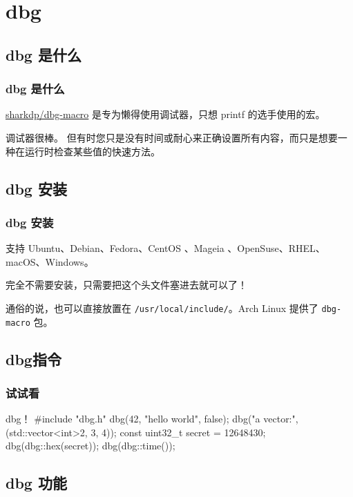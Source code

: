 \documentclass[xcolor=table,dvipsnames,svgnames,aspectratio=169]{ctexbeamer}
\begin{document}
\section{dbg}

\subsection{dbg 是什么}

\begin{frame}
  \frametitle{dbg 是什么}

  \href{https://github.com/sharkdp/dbg-macro}{sharkdp/dbg-macro} 是专为懒得使用调试器，只想 printf 的选手使用的宏。

  调试器很棒。 但有时您只是没有时间或耐心来正确设置所有内容，而只是想要一种在运行时检查某些值的快速方法。

\end{frame}

\subsection{dbg 安装}

\begin{frame}
  \frametitle{dbg 安装}
  支持 Ubuntu、Debian、Fedora、CentOS 、Mageia 、OpenSuse、RHEL、macOS、Windows。

  完全不需要安装，只需要把这个头文件塞进去就可以了！

  通俗的说，也可以直接放置在 \lstinline|/usr/local/include/|。Arch Linux 提供了 \lstinline|dbg-macro| 包。
\end{frame}

\subsection{dbg指令}

\begin{frame}[fragile]
  \frametitle{试试看}
  \begin{codeblock}[language=c++]{dbg！}
#include "dbg.h"
dbg(42, "hello world", false);
dbg("a vector:", (std::vector<int>{2, 3, 4}));
const uint32_t secret = 12648430;
dbg(dbg::hex(secret));
dbg(dbg::time());
  \end{codeblock}
\end{frame}

\subsection{dbg 功能}
\end{document}
